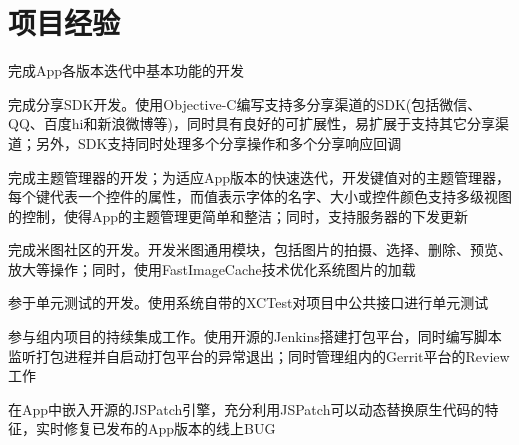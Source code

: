 \documentclass[]{deedy-resume-document-class}
\begin{document}
\begin{minipage}[t]{0.66\textwidth}


\section{项目经验}
\begin{tightemize}
\item 完成App各版本迭代中基本功能的开发
\item 完成分享SDK开发。使用Objective-C编写支持多分享渠道的SDK(包括微信、QQ、百度hi和新浪微博等)，同时具有良好的可扩展性，易扩展于支持其它分享渠道；另外，SDK支持同时处理多个分享操作和多个分享响应回调
\item 完成主题管理器的开发；为适应App版本的快速迭代，开发键值对的主题管理器，每个键代表一个控件的属性，而值表示字体的名字、大小或控件颜色支持多级视图的控制，使得App的主题管理更简单和整洁；同时，支持服务器的下发更新
\item 完成米图社区的开发。开发米图通用模块，包括图片的拍摄、选择、删除、预览、放大等操作；同时，使用FastImageCache技术优化系统图片的加载
\item 参于单元测试的开发。使用系统自带的XCTest对项目中公共接口进行单元测试
\item 参与组内项目的持续集成工作。使用开源的Jenkins搭建打包平台，同时编写脚本监听打包进程并自启动打包平台的异常退出；同时管理组内的Gerrit平台的Review工作
\item 在App中嵌入开源的JSPatch引擎，充分利用JSPatch可以动态替换原生代码的特征，实时修复已发布的App版本的线上BUG
\end{tightemize}
\sectionsep





\end{minipage}
\end{document}
